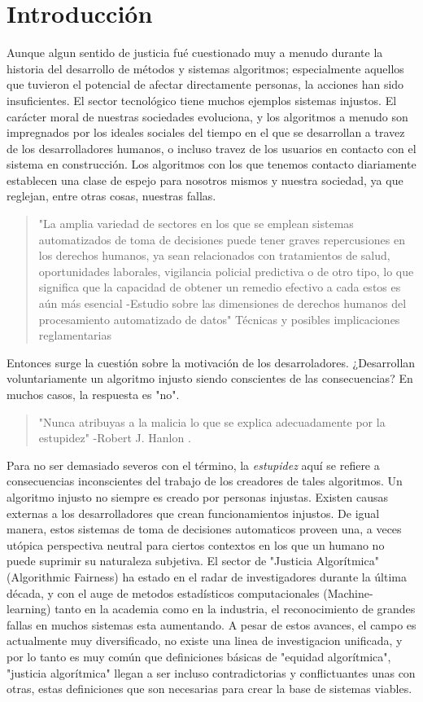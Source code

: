 \section{Introducción}
Aunque algun sentido de justicia fué cuestionado muy a menudo durante la historia del desarrollo de métodos y sistemas algoritmos; especialmente aquellos que tuvieron el potencial de afectar directamente personas\cite{Pehn20}, la acciones han sido insuficientes. El sector tecnológico tiene muchos ejemplos sistemas injustos.
El carácter moral de nuestras sociedades evoluciona, y los algoritmos a menudo son impregnados por los ideales sociales del tiempo en el que se desarrollan a travez de los desarrolladores humanos, o incluso travez de los usuarios en contacto con el sistema en construcción. Los algoritmos con los que tenemos contacto diariamente establecen una clase de espejo para nosotros mismos y nuestra sociedad, ya que reglejan, entre otras cosas, nuestras fallas.
\begin{quote}
  "La amplia variedad de sectores en los que se emplean sistemas automatizados de toma de decisiones puede tener graves repercusiones en los derechos humanos, ya sean relacionados con tratamientos de salud, oportunidades laborales, vigilancia policial predictiva o de otro tipo, lo que significa que la capacidad de obtener un remedio efectivo a cada estos es aún más esencial -Estudio sobre las dimensiones de derechos humanos del procesamiento automatizado de datos"
  Técnicas y posibles implicaciones reglamentarias
\end{quote} \cite{CommNaN}

Entonces surge la cuestión sobre la motivación de los desarroladores. ¿Desarrollan voluntariamente un algoritmo injusto siendo conscientes de las consecuencias? En muchos casos, la respuesta es "no".\cite{OCDK19}
\begin{quote}
  "Nunca atribuyas a la malicia lo que se explica adecuadamente por la estupidez" -Robert J. Hanlon \cite{Bloc81}.
\end{quote}
Para no ser demasiado severos con el término, la \textsl{estupidez} aquí se refiere a consecuencias inconscientes del trabajo de los creadores de tales algoritmos. Un algoritmo injusto no siempre es creado por personas injustas. Existen causas externas a los desarrolladores que crean funcionamientos injustos.
De igual manera, estos sistemas de toma de decisiones automaticos proveen una, a veces utópica perspectiva neutral para ciertos contextos en los que un humano no puede suprimir su naturaleza subjetiva.
El sector de "Justicia Algorítmica" (Algorithmic Fairness) ha estado en el radar de investigadores durante la última década, y con el auge de metodos estadísticos computacionales (Machine-learning) tanto en la academia como en la industria, el reconocimiento de grandes fallas en muchos sistemas esta aumentando. A pesar de estos avances, el campo es actualmente muy diversificado, no existe una linea de investigacion unificada, y por lo tanto es muy común que definiciones básicas de "equidad algorítmica", "justicia algorítmica" llegan a ser incluso contradictorias y conflictuantes unas con otras, estas definiciones que son necesarias para crear la base de sistemas viables.

